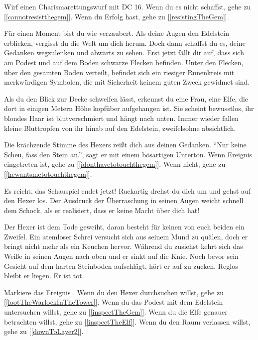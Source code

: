 Wirf einen Charismarettungswurf mit DC 16. Wenn du es nicht schaffst, gehe zu [\ref{cannotresistthegem}]. Wenn du Erfolg hast, gehe zu [\ref{resistingTheGem}].


Für einen Moment bist du wie verzaubert. Als deine Augen den Edelstein erblicken, vergisst du die Welt um dich herum. Doch dann schaffst du es, deine Gedanken wegzulenken und abwärts zu sehen. Erst jetzt fällt dir auf, dass sich am Podest und auf dem Boden schwarze Flecken befinden. Unter den Flecken, über den gesamten Boden verteilt, befindet sich ein riesiger Runenkreis mit merkwürdigen Symbolen, die mit Sicherheit keinem guten Zweck gewidmet sind.

Als du den Blick zur Decke schweifen lässt, erkennst du eine Frau, eine Elfe, die dort in einigen Metern Höhe kopfüber aufgehangen ist. Sie scheint bewusstlos, ihr blondes Haar ist blutverschmiert und hängt nach unten. Immer wieder fallen kleine Bluttropfen von ihr hinab auf den Edelstein, zweifelsohne absichtlich.

Die krächzende Stimme des Hexers reißt dich aus deinen Gedanken. ``Nur keine Scheu, fass den Stein an.'', sagt er mit einem bösartigen Unterton.
Wenn Ereignis  eingetreten ist, gehe zu [\ref{idonthavetotouchthegem}]. Wenn nicht, gehe zu [\ref{hewantsmetotouchthegem}].


Es reicht, das Schauspiel endet jetzt! Ruckartig drehst du dich um und gehst auf den Hexer los. Der Ausdruck der Überraschung in seinen Augen weicht schnell dem Schock, als er realisiert, dass er keine Macht über dich hat!



Der Hexer ist dem Tode geweiht, daran besteht für keinen von euch beiden ein Zweifel. Ein atemloser Schrei versucht sich aus seinem Mund zu quälen, doch er bringt nicht mehr als ein Keuchen hervor. Während du zusiehst kehrt sich das Weiße in seinen Augen nach oben und er sinkt auf die Knie. Noch bevor sein Gesicht auf dem harten Steinboden aufschlägt, hört er auf zu zucken. Reglos bleibt er liegen. Er ist tot.

Markiere das Ereignis .
Wenn du den Hexer durchsuchen willst, gehe zu [\ref{lootTheWarlockInTheTower}].
Wenn du das Podest mit dem Edelstein untersuchen willst, gehe zu [\ref{inspectTheGem}].
Wenn du die Elfe genauer betrachten willst, gehe zu [\ref{inspectTheElf}].
Wenn du den Raum verlassen willst, gehe zu [\ref{downToLayer2}].

